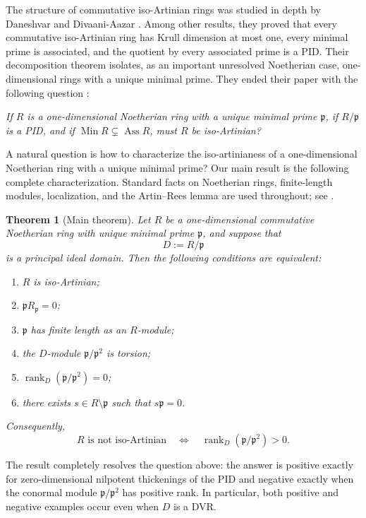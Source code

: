 \documentclass[11pt]{article}
\newtheorem{theorem}{Theorem}[section]
\theoremstyle{definition}
\newcommand{\Ass}{\operatorname{Ass}}
\newcommand{\Min}{\operatorname{Min}}
\newcommand{\rank}{\operatorname{rank}}
\begin{document}
The structure of commutative iso-Artinian rings was studied in depth by Daneshvar and
Divaani-Aazar \cite{DaneshvarDivaaniAazar2025}.  Among other results, they proved that every
commutative iso-Artinian ring has Krull dimension at most one, every minimal prime is
associated, and the quotient by every associated prime is a PID.  Their decomposition theorem
isolates, as an important unresolved Noetherian case, one-dimensional rings with a unique
minimal prime.  They ended their paper with the following question
\cite[Question~3.9]{DaneshvarDivaaniAazar2025}:

\medskip
\noindent\emph{If $R$ is a one-dimensional Noetherian ring with a unique minimal prime
$\mathfrak p$, if $R/\mathfrak p$ is a PID, and if
$\Min R\subsetneq\Ass R$, must $R$ be iso-Artinian?}
\medskip

A natural question is how to characterize the iso-artinianess of  a one-dimensional Noetherian ring with a unique minimal prime? Our main result is the following complete characterization.  Standard facts on Noetherian
rings, finite-length modules, localization, and the Artin--Rees lemma are used throughout; see
\cite{AtiyahMacdonald1969,Eisenbud1995,Matsumura1986}.

\begin{theorem}[Main theorem]\label{thm:intro-main}
Let $R$ be a one-dimensional commutative Noetherian ring with unique minimal prime
$\mathfrak p$, and suppose that
\[
 D:=R/\mathfrak p
\]
is a principal ideal domain.  Then the following conditions are equivalent:
\begin{enumerate}[label=\textup{(\roman*)}]
\item $R$ is iso-Artinian;
\item $\mathfrak pR_{\mathfrak p}=0$;
\item $\mathfrak p$ has finite length as an $R$-module;
\item the $D$-module $\mathfrak p/\mathfrak p^2$ is torsion;
\item $\rank_D(\mathfrak p/\mathfrak p^2)=0$;
\item there exists $s\in R\setminus\mathfrak p$ such that $s\mathfrak p=0$.
\end{enumerate}
Consequently,
\[
 R\text{ is not iso-Artinian}
 \quad\Longleftrightarrow\quad
 \rank_D(\mathfrak p/\mathfrak p^2)>0.
\]
\end{theorem}


The result completely resolves the question above: the answer is positive exactly for
zero-dimensional nilpotent thickenings of the PID and negative exactly when the conormal
module $\mathfrak p/\mathfrak p^2$ has positive rank.  In particular, both positive and negative examples occur even when
$D$ is a DVR.
\end{document}
